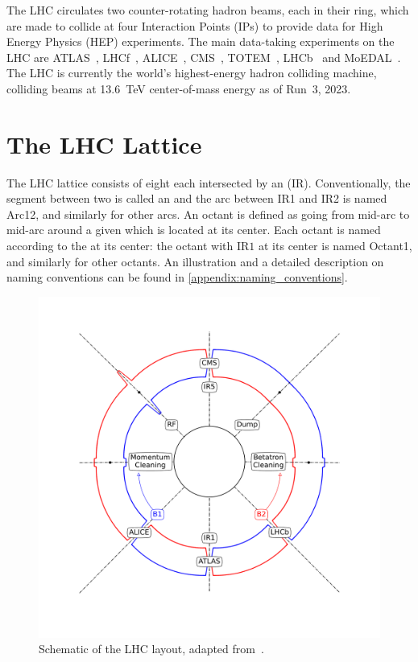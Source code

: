 The LHC circulates two counter-rotating hadron beams, each in their ring, which are made to collide at four Interaction Points (IPs) to provide data for High Energy Physics (HEP) experiments.
The main data-taking experiments on the LHC are ATLAS~\cite{Website:ATLAS,Website:ATLAS_CDS}, LHCf~\cite{Website:LHCf,Website:LHCf_CDS}, ALICE~\cite{Website:ALICE,Website:ALICE_CDS}, CMS~\cite{Website:CMS,Website:CMS_CDS}, TOTEM~\cite{Website:TOTEM,Website:TOTEM_CDS}, LHCb~\cite{Website:LHCb,Website:LHCb_CDS} and MoEDAL~\cite{Website:MOEDAL,Website:MOEDAL_CDS}.
The LHC is currently the world's highest-energy hadron colliding machine, colliding beams at \qty{13.6}{\tera\electronvolt} center-of-mass energy as of Run~\num{3}, \num{2023}.


\section{The LHC Lattice}
\label{section:lhc_lattice}

The LHC lattice consists of eight  each intersected by an  (IR).
Conventionally, the segment between two \IRs is called an  and the arc between IR1 and IR2 is named Arc12, and similarly for other arcs.
An octant is defined as going from mid-arc to mid-arc around a given \IR which is located at its center.
Each octant is named according to the \IR at its center: the octant with \(\mathrm{IR1}\) at its center is named Octant1, and similarly for other octants.
An illustration and a detailed description on naming conventions can be found in \cref{appendix:naming_conventions}.

\begin{figure}[!h]
  \centering
  \includegraphics*[width=0.65\linewidth]{Figures/Optics_Measurements_Corrections_at_LHC/lhc_schematic.pdf}
  \caption{Schematic of the LHC layout, adapted from~\cite{PHD:Poyet}.}
  \label{figure:lhc_schematic_layout}
\end{figure}

